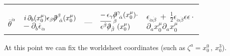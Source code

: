 \documentclass[12pt]{article}
\newcommand{\p}{\partial}
\newcommand{\ov}{\overline}
\def\slashed#1{\setbox0=\hbox{$#1$}             %
   \dimen0=\wd0                                 %
   \setbox1=\hbox{/} \dimen1=\wd1               %
   \ifdim\dimen0>\dimen1                        %
      \rlap{\hbox to \dimen0{\hfil/\hfil}}      %
      #1                                        %
   \else                                        %
      \rlap{\hbox to \dimen1{\hfil$#1$\hfil}}   %
      /                                         %
   \fi}                                        %
\newcommand{\x}{x_0^\mu}
\begin{document}
\begin{flushleft}
\begin{tabular}{c||p{3.0cm}|p{3.0cm}|p{3.0cm}|p{3.0cm}}
&&&&\\
&&&&\\
\hline
	\multirow{3}{*}{
	\centering
	$\ov{\theta}^{\dot{\alpha}}$
	}
&
	\multirow{3}{*}{
	\parbox{3.0cm}{\centering
	$ i\,\p_b(\x)\epsilon_\beta\slashed{\p}^\beta_{\ \dot{\alpha}}(\x) $ \\[1.0mm]
	$ -~ \p_b \ov{\epsilon}_{\dot{\alpha}} $
	}}
&
	\multirow{3}{*}{
	\parbox{3.0cm}{\centering
	---
	}}
&
	\multirow{3}{*}{
	\parbox{3.0cm}{\centering
	$-\, \epsilon_\gamma\slashed{\p}^{\gamma}_{\ \dot{\alpha}}(\x)\cdot$ \\[1.0mm]
	$\ov{\epsilon^{\dot{\beta}}\slashed{\p}}_{\dot{\beta}}^{\ \beta}(\x)$
	}}
&
	\multirow{3}{*}{
	\parbox{3.0cm}{\centering
	$\epsilon_{\dot{\alpha}\dot{\beta}} ~+~ 
	\frac{1}{2} \epsilon_{\dot{\alpha}\dot{\beta}} \epsilon\epsilon \cdot $ \\[1.0mm]
	$\p_a\x\p_a\x $
	}}\\ [2.0mm]
&&&&\\
&&&&\\
\end{tabular}
\end{flushleft}

	At this point we can fix the worldsheet coordinates (such as $ \zeta^a = x_0^0\,,~ x_0^3 $).
\end{document}
